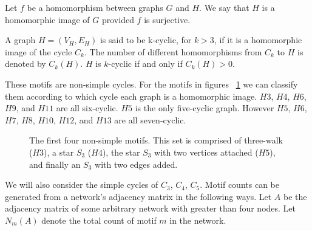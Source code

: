 \begin{dfn}
    Let $f$ be a homomorphism between graphs $G$ and $H$. We say that $H$ is a
    homomorphic image of $G$ provided $f$ is surjective.
\end{dfn}

\begin{dfn}
    A graph $H = (V_H, E_H)$ is said to be k-cyclic, for $k > 3$, if it is a
homomorphic image of the cycle $C_k$. The number of different homomorphisms from $C_k$
to $H$ is denoted by $C_k(H)$.  $H$ is $k$-cyclic if and only if $C_k(H) > 0$.
\end{dfn}

These motifs are non-simple cycles. For the motifs in figures ~\ref{fig:motifs1} we can classify them according to which cycle 
each graph is a homomorphic image. $H3$, $H4$, $H6$, $H9$, and $H11$ are all six-cyclic. $H5$
is the only five-cyclic graph. However $H5$, $H6$, $H7$, $H8$, $H10$, $H12$, and $H13$ are 
all seven-cyclic.

\begin{figure}[ht!]
    \centering
    \caption{The first four non-simple motifs. This set is comprised
    of three-walk ($H3$), a star $S_3$ ($H4$), the star $S_3$ with two vertices
    attached ($H5$), and finally an $S_3$ with two edges added.\label{fig:motifs1}}
\end{figure}



\FloatBarrier

\vspace{3mm} 

We will also consider the simple cycles of $C_3$, $C_4$, $C_5$. Motif counts can be generated from a network's adjacency matrix in the following ways. Let $A$
be the adjacency matrix of some arbitrary network with greater than four nodes. Let $N_m(A)$ denote 
the total count of motif $m$ in the network. 

\vspace{3mm}

